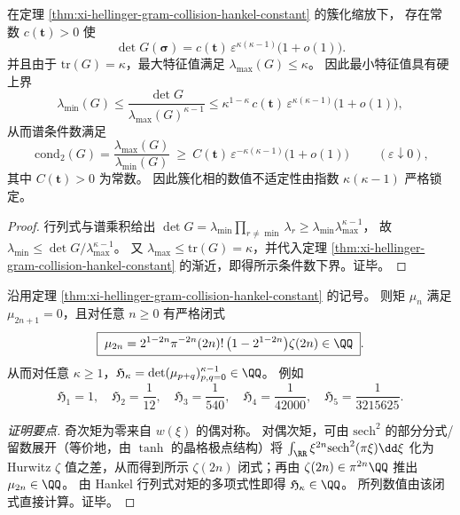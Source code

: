 \begin{corollary}\label{cor:xi-hellinger-gram-cluster-conditioning-exponent}
在定理 \ref{thm:xi-hellinger-gram-collision-hankel-constant} 的簇化缩放下，
存在常数 \(c(\mathbf t)>0\) 使
\[
\det G(\boldsymbol{\sigma})=c(\mathbf t)\,\varepsilon^{\kappa(\kappa-1)}\bigl(1+o(1)\bigr).
\]
并且由于 \(\mathrm{tr}(G)=\kappa\)，最大特征值满足 \(\lambda_{\max}(G)\le \kappa\)。
因此最小特征值具有硬上界
\[
\lambda_{\min}(G)\le \frac{\det G}{\lambda_{\max}(G)^{\kappa-1}}
\le \kappa^{1-\kappa}\,c(\mathbf t)\,\varepsilon^{\kappa(\kappa-1)}\bigl(1+o(1)\bigr),
\]
从而谱条件数满足
\[
\boxed{\;
\mathrm{cond}_2(G)=\frac{\lambda_{\max}(G)}{\lambda_{\min}(G)}
\ \ge\ C(\mathbf t)\,\varepsilon^{-\kappa(\kappa-1)}\bigl(1+o(1)\bigr)\;}
\qquad(\varepsilon\downarrow 0),
\]
其中 \(C(\mathbf t)>0\) 为常数。
因此簇化相的数值不适定性由指数 \(\kappa(\kappa-1)\) 严格锁定。
\end{corollary}
\begin{proof}
行列式与谱乘积给出
\(
\det G=\lambda_{\min}\prod_{r\neq\min}\lambda_r\ge \lambda_{\min}\lambda_{\max}^{\kappa-1}
\)，
故 \(\lambda_{\min}\le \det G/\lambda_{\max}^{\kappa-1}\)。
又 \(\lambda_{\max}\le \mathrm{tr}(G)=\kappa\)，并代入定理 \ref{thm:xi-hellinger-gram-collision-hankel-constant} 的渐近，即得所示条件数下界。证毕。
\end{proof}

\begin{proposition}\label{prop:xi-hellinger-hankel-constant-rationality}
沿用定理 \ref{thm:xi-hellinger-gram-collision-hankel-constant} 的记号。
则矩 \(\mu_n\) 满足 \(\mu_{2n+1}=0\)，且对任意 \(n\ge 0\) 有严格闭式
\[
\boxed{\;
\mu_{2n}
=2^{1-2n}\pi^{-2n}(2n)!\,\bigl(1-2^{1-2n}\bigr)\zeta(2n)\in\QQ\; }.
\]
从而对任意 \(\kappa\ge 1\)，\(\mathfrak H_\kappa=\det(\mu_{p+q})_{p,q=0}^{\kappa-1}\in\QQ\)。
例如
\[
\boxed{\;
\mathfrak H_1=1,\quad
\mathfrak H_2=\frac{1}{12},\quad
\mathfrak H_3=\frac{1}{540},\quad
\mathfrak H_4=\frac{1}{42000},\quad
\mathfrak H_5=\frac{1}{3215625}.\;}
\]
\end{proposition}
\begin{proof}[证明要点]
奇次矩为零来自 \(w(\xi)\) 的偶对称。
对偶次矩，可由 \(\mathrm{sech}^2\) 的部分分式/留数展开（等价地，由 \(\tanh\) 的晶格极点结构）将
\(\int_{\RR}\xi^{2n}\mathrm{sech}^{2}(\pi\xi)\dd\xi\)
化为 Hurwitz \(\zeta\) 值之差，从而得到所示 \(\zeta(2n)\) 闭式；再由
\(\zeta(2n)\in \pi^{2n}\QQ\)
推出 \(\mu_{2n}\in\QQ\)。
由 Hankel 行列式对矩的多项式性即得 \(\mathfrak H_\kappa\in\QQ\)。
所列数值由该闭式直接计算。证毕。
\end{proof}


